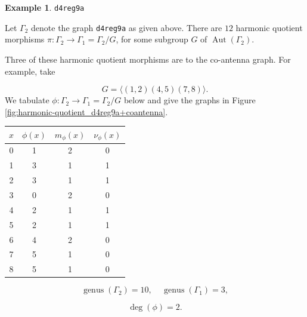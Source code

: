 \documentclass[12pt,letterpaper]{article}
\theoremstyle{definition}
\newtheorem{example}[theorem]{Example}
\DeclareMathOperator{\Aut}{Aut}
\DeclareMathOperator{\genus}{genus}
\begin{document}
\begin{example}%
\label{example:d4reg9a}
 {\tt d4reg9a}\newline
{\rm  
  Let $\Gamma_2$ denote the graph {\tt d4reg9a} as given above.
There are $12$ harmonic quotient morphisms
$\pi: \Gamma_2\to \Gamma_1=\Gamma_2/G$,
for some subgroup $G$ of $\Aut(\Gamma_2)$.

Three of these harmonic quotient morphisms are to the co-antenna graph.
For example, take 

\[
G = \langle (1,2)(4,5)(7,8) \rangle.
\]
We tabulate $\phi: \Gamma_2\to \Gamma_1=\Gamma_2/G$
below and give the graphs in Figure \ref{fig:harmonic-quotient_d4reg9a+coantenna}.

\begin{center}
\begin{tabular}{c|c|c|c}  
  $x$ & $\phi(x)$ & $m_\phi(x)$ & $\nu_\phi(x)$ \\ \hline
  0   &    1   &        2         &  0   \\
  1   &    3   &        1         &  1   \\
  2   &    3   &        1         &  1   \\
  3   &    0   &        2         &  0   \\
  4   &    2   &        1         &  1   \\
  5   &    2   &        1         &  1   \\
  6   &    4   &        2         &  0   \\
  7   &    5   &        1         &  0   \\
  8   &    5   &        1         &  0   \\
\end{tabular}
\end{center}

\[
  \genus(\Gamma_2) =10,\ \ \ \ \
  \genus(\Gamma_1) =3,
\]

\[
\deg(\phi) =2.
\]

}
\end{example}
\end{document}
